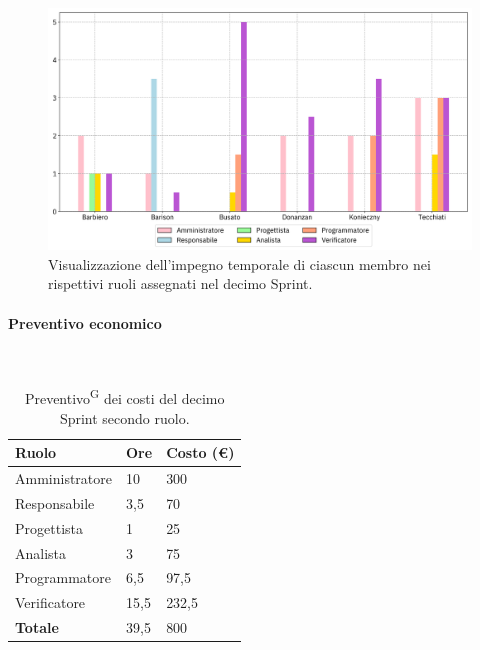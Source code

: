 \documentclass[8pt]{article}
\newcommand{\glossterm}[1]{#1\textsuperscript{G}} %
\newcommand{\subsubsubsection}[1]{\paragraph{#1}\mbox{}\\}
\begin{document}
\begin{figure}[ht!]
    \centering
    \includegraphics[width=15cm]{./images_pdp/istogramma_periodo_10.png}
    \caption{Visualizzazione dell'impegno temporale di ciascun membro nei rispettivi ruoli assegnati
    nel decimo Sprint.}
    \label{figure:Visualizzazione dell'impegno temporale di ciascun membro nei rispettivi ruoli
    assegnati nel decimo Sprint}
\end{figure}
\subsubsubsection{Preventivo economico}
    \begin{table}[ht!]
	\centering
	\begin{tabular}{p{4cm} p{1cm} p{2cm}}
        \toprule
        \textbf{Ruolo} & \textbf{Ore} & \textbf{Costo (€)} \\
        \midrule
        Amministratore & 10 & 300 \\ 
        Responsabile & 3,5 & 70 \\ 
        Progettista & 1 & 25 \\ 
        Analista & 3 & 75 \\ 
        Programmatore & 6,5 & 97,5 \\ 
        Verificatore & 15,5 & 232,5 \\
        \midrule 
        \textbf{Totale} & 39,5 & 800 \\ 
        \bottomrule
    \end{tabular}
    \caption{\glossterm{Preventivo} dei costi del decimo Sprint secondo ruolo.}
	\label{table:Preventivo dei costi del decimo Sprint secondo ruolo}
\end{table}
\end{document}
